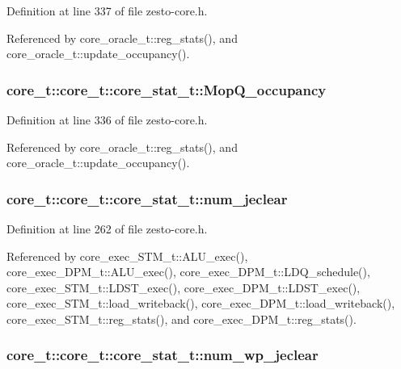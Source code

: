 Definition at line 337 of file zesto-core.h.

Referenced by core\_\-oracle\_\-t::reg\_\-stats(), and core\_\-oracle\_\-t::update\_\-occupancy().
\subsubsection[{MopQ\_\-occupancy}]{ core\_\-t::core\_\-t::core\_\-stat\_\-t::MopQ\_\-occupancy}\label{structcore__t_1_1core__stat__t_0fe73f7da6d6422f041b6e1f59fe1a91}




Definition at line 336 of file zesto-core.h.

Referenced by core\_\-oracle\_\-t::reg\_\-stats(), and core\_\-oracle\_\-t::update\_\-occupancy().
\subsubsection[{num\_\-jeclear}]{ core\_\-t::core\_\-t::core\_\-stat\_\-t::num\_\-jeclear}\label{structcore__t_1_1core__stat__t_e6a4a159e00e9d5b93db9544015f98f7}




Definition at line 262 of file zesto-core.h.

Referenced by core\_\-exec\_\-STM\_\-t::ALU\_\-exec(), core\_\-exec\_\-DPM\_\-t::ALU\_\-exec(), core\_\-exec\_\-DPM\_\-t::LDQ\_\-schedule(), core\_\-exec\_\-STM\_\-t::LDST\_\-exec(), core\_\-exec\_\-DPM\_\-t::LDST\_\-exec(), core\_\-exec\_\-STM\_\-t::load\_\-writeback(), core\_\-exec\_\-DPM\_\-t::load\_\-writeback(), core\_\-exec\_\-STM\_\-t::reg\_\-stats(), and core\_\-exec\_\-DPM\_\-t::reg\_\-stats().
\subsubsection[{num\_\-wp\_\-jeclear}]{ core\_\-t::core\_\-t::core\_\-stat\_\-t::num\_\-wp\_\-jeclear}\label{structcore__t_1_1core__stat__t_33a60de88faadccd45eacdf575271002}




